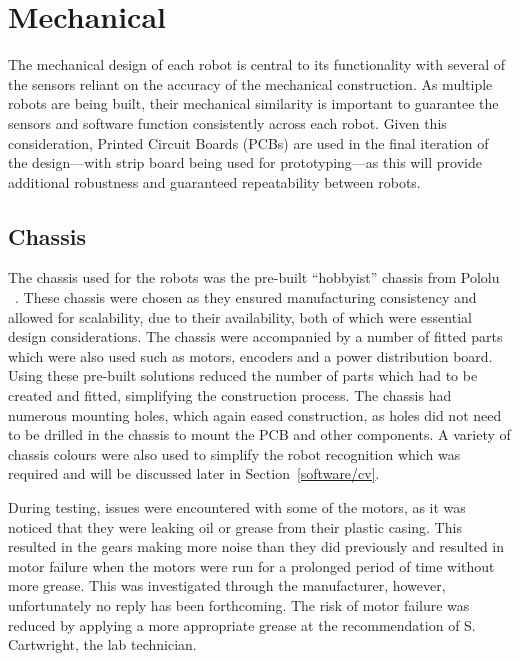 
\chapter{Mechanical}\label{mechanical}

The mechanical design of each robot is central to its 
functionality with several of the sensors
reliant on the accuracy of the mechanical construction. As 
multiple robots are being built, 
their mechanical similarity is important to guarantee the 
sensors and software function consistently across each robot. 
Given this consideration, Printed Circuit Boards (PCBs) are used in 
the final iteration of the design---with strip board being used for 
prototyping---as this will provide additional robustness and 
guaranteed repeatability between robots.

\section{Chassis}\label{mech/chassis}
The chassis used for the robots was the pre-built ``hobbyist'' 
chassis from Pololu ~\cite{pololuchassis}. These chassis were 
chosen as they ensured manufacturing  consistency and allowed 
for scalability, due to their availability, both of which were 
essential design considerations. The chassis were accompanied by 
a number of fitted parts which were also used such as motors, 
encoders and a power distribution board. Using these pre-built 
solutions reduced the number of parts which had to be created 
and fitted, simplifying the construction process.
The chassis had numerous mounting holes, which again eased 
construction, as holes did not need to be drilled in the chassis 
to mount the PCB and other components. A variety of chassis 
colours were also used to simplify the robot recognition which 
was required and will be discussed later in Section~\ref{software/cv}. 

During testing, issues were encountered with some of the motors, 
as it was noticed that they 
were leaking oil or grease from their plastic casing. This 
resulted in the gears making more noise than they did previously 
and resulted in motor failure when the motors were run for a 
prolonged period of time without more grease. This was 
investigated through the manufacturer, however, unfortunately no 
reply has been forthcoming. The risk of motor failure was 
reduced by applying a more appropriate grease at the 
recommendation of S. Cartwright, the lab technician.  

